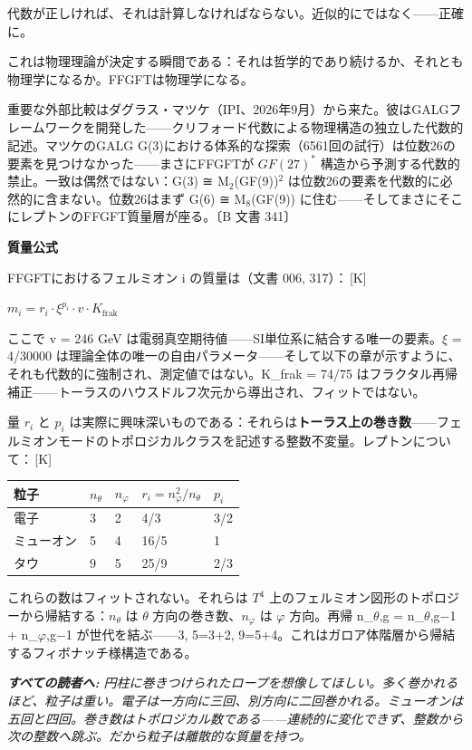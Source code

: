 \documentclass[11pt,openany]{book}
\newcommand{\status}[1]{\penalty10000\,{\tiny\textcolor{gray!70}{[#1]}}}
\newenvironment{laierspur}{%
  \par\vspace{4pt}%
  \noindent\small\itshape\color{blue!60!black}%
  \textbf{すべての読者へ:}\enspace\ignorespaces}{%
  \par\vspace{4pt}\normalsize\normalfont\normalcolor}
\begin{document}
代数が正しければ、それは計算しなければならない。近似的にではなく——正確に。

これは物理理論が決定する瞬間である：それは哲学的であり続けるか、それとも物理学になるか。FFGFTは物理学になる。

重要な外部比較はダグラス・マツケ（IPI、2026年9月）から来た。彼はGALGフレームワークを開発した——クリフォード代数による物理構造の独立した代数的記述。マツケのGALG G(3)における体系的な探索（6561回の試行）は位数26の要素を見つけなかった——まさにFFGFTが $GF(27)^*$ 構造から予測する代数的禁止。一致は偶然ではない：G(3) ≅ M$_2$(GF(9))$^2$ は位数26の要素を代数的に必然的に含まない。位数26はまず G(6) ≅ M$_8$(GF(9)) に住む——そしてまさにそこにレプトンのFFGFT質量層が座る。〔B 文書 341〕

\textbf{質量公式}

FFGFTにおけるフェルミオン i の質量は（文書 006, 317）：\status{K}

$m_i = r_i \cdot \xi^{p_i} \cdot v \cdot K_\text{frak}$

ここで v = 246 GeV は電弱真空期待値——SI単位系に結合する唯一の要素。$\xi$ = 4/30000 は理論全体の唯一の自由パラメータ——そして以下の章が示すように、それも代数的に強制され、測定値ではない。K\_frak = 74/75 はフラクタル再帰補正——トーラスのハウスドルフ次元から導出され、フィットではない。

量 $r_i$ と $p_i$ は実際に興味深いものである：それらは\textbf{トーラス上の巻き数}——フェルミオンモードのトポロジカルクラスを記述する整数不変量。レプトンについて：\status{K}

\begin{tabular}{lllll}
\toprule
粒子 & $n_\theta$ & $n_\varphi$ & $r_i = n_\varphi^2/n_\theta$ & $p_i$ \\
\midrule
電子 & 3 & 2 & 4/3 & 3/2 \\
ミューオン & 5 & 4 & 16/5 & 1 \\
タウ & 9 & 5 & 25/9 & 2/3 \\
\bottomrule
\end{tabular}

これらの数はフィットされない。それらは $T^4$ 上のフェルミオン図形のトポロジーから帰結する：$n_\theta$ は $\theta$ 方向の巻き数、$n_\varphi$ は $\varphi$ 方向。再帰 n\_{$\theta$,g} = n\_{$\theta$,g$-$1} + n\_{$\varphi$,g$-$1} が世代を結ぶ——3, 5=3+2, 9=5+4。これはガロア体階層から帰結するフィボナッチ様構造である。

\begin{laierspur}
円柱に巻きつけられたロープを想像してほしい。多く巻かれるほど、粒子は重い。電子は一方向に三回、別方向に二回巻かれる。ミューオンは五回と四回。巻き数はトポロジカル数である——連続的に変化できず、整数から次の整数へ跳ぶ。だから粒子は離散的な質量を持つ。
\end{laierspur}
\end{document}

